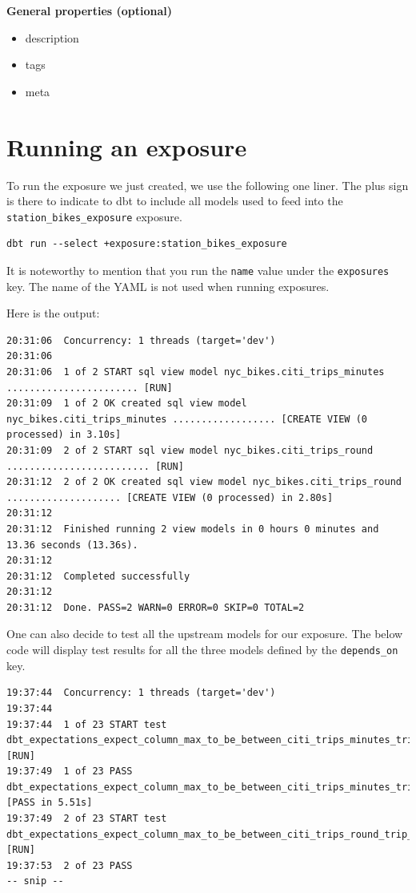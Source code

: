 \documentclass[
]{book}
\providecommand{\tightlist}{%
  \setlength{\itemsep}{0pt}\setlength{\parskip}{0pt}}
\begin{document}
\textbf{General properties (optional)}

\begin{itemize}
\tightlist
\item
  description
\item
  tags
\item
  meta
\end{itemize}

\hypertarget{running-an-exposure}{%
\section{Running an exposure}\label{running-an-exposure}}

To run the exposure we just created, we use the following one liner. The plus sign is there to indicate to dbt to include all models used to feed into the \texttt{station\_bikes\_exposure} exposure.

\begin{verbatim}
dbt run --select +exposure:station_bikes_exposure
\end{verbatim}

It is noteworthy to mention that you run the \texttt{name} value under the \texttt{exposures} key. The name of the YAML is not used when running exposures.

Here is the output:

\begin{verbatim}
20:31:06  Concurrency: 1 threads (target='dev')
20:31:06  
20:31:06  1 of 2 START sql view model nyc_bikes.citi_trips_minutes ....................... [RUN]
20:31:09  1 of 2 OK created sql view model nyc_bikes.citi_trips_minutes .................. [CREATE VIEW (0 processed) in 3.10s]
20:31:09  2 of 2 START sql view model nyc_bikes.citi_trips_round ......................... [RUN]
20:31:12  2 of 2 OK created sql view model nyc_bikes.citi_trips_round .................... [CREATE VIEW (0 processed) in 2.80s]
20:31:12  
20:31:12  Finished running 2 view models in 0 hours 0 minutes and 13.36 seconds (13.36s).
20:31:12  
20:31:12  Completed successfully
20:31:12  
20:31:12  Done. PASS=2 WARN=0 ERROR=0 SKIP=0 TOTAL=2
\end{verbatim}

One can also decide to test all the upstream models for our exposure. The below code will display test results for all the three models defined by the \texttt{depends\_on} key.

\begin{verbatim}
19:37:44  Concurrency: 1 threads (target='dev')
19:37:44  
19:37:44  1 of 23 START test dbt_expectations_expect_column_max_to_be_between_citi_trips_minutes_trip_duration_min__326000__16  [RUN]
19:37:49  1 of 23 PASS dbt_expectations_expect_column_max_to_be_between_citi_trips_minutes_trip_duration_min__326000__16  [PASS in 5.51s]
19:37:49  2 of 23 START test dbt_expectations_expect_column_max_to_be_between_citi_trips_round_trip_duration_min__326000__16  [RUN]
19:37:53  2 of 23 PASS 
-- snip --
\end{verbatim}
\end{document}
